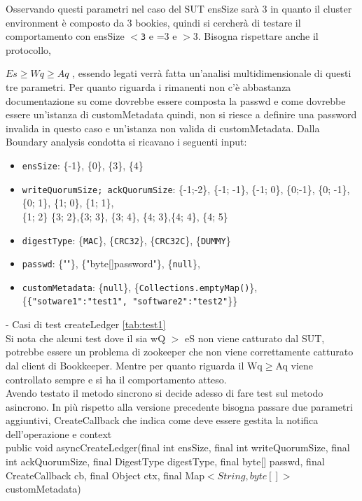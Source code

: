 \documentclass[10pt]{article}
\begin{document}
	Osservando questi parametri nel caso del SUT ensSize sarà 3 in quanto il cluster environment è composto da 3 bookies, quindi si cercherà di testare il comportamento con ensSize \texttt{$<$3} e =3 e \texttt{{$>3$}}. Bisogna rispettare anche il protocollo, {\texttt{$Es \ge Wq \ge Aq$} , essendo legati verrà fatta un'analisi multidimensionale di questi tre parametri. Per quanto riguarda i rimanenti non c'è abbastanza documentazione su come dovrebbe essere composta la passwd e come dovrebbe essere un'istanza di customMetadata quindi, non si riesce a definire una password invalida in questo caso e un'istanza non valida di customMetadata. Dalla Boundary analysis condotta si ricavano i seguenti input:
		\begin{itemize}[label=--, itemsep=2pt, parsep=0pt]
			\item \texttt{ensSize}: \{-1\}, \{0\}, \{3\}, \{4\}
			\item \texttt{writeQuorumSize; ackQuorumSize}: 
			\{-1;-2\}, \{-1; -1\}, \{-1; 0\},
			\{0;-1\}, \{0; -1\}, \{0; 1\},
			\{1; 0\}, \{1; 1\},\\ \{1; 2\}
			\{3; 2\},\{3; 3\}, \{3; 4\},
			\{4; 3\},\{4; 4\}, \{4; 5\}
			\item \texttt{digestType}: \{\texttt{MAC}\}, \{\texttt{CRC32}\}, \{\texttt{CRC32C}\}, \{\texttt{DUMMY}\}
			\item \texttt{passwd}: \{""\}, \{"byte[]password"\}, \{\texttt{null}\},
			\item \texttt{customMetadata}:  \{\texttt{null}\}, \{\texttt{Collections.emptyMap()}\}, \{\texttt{\{"sotware1":"test1", "software2":"test2"}\}\}
		\end{itemize}
		- Casi di test createLedger \autoref{tab:test1}\\
		Si nota che alcuni test dove il sia wQ \texttt{$>$} eS non viene catturato dal SUT, potrebbe essere un problema di zookeeper che non viene correttamente catturato dal client di Bookkeeper. Mentre per quanto riguarda il Wq\texttt{$\ge$}Aq viene controllato sempre e si ha il comportamento atteso.\\
		Avendo testato il metodo sincrono si decide adesso di fare test sul metodo asincrono.
		In più rispetto alla versione precedente bisogna passare due parametri aggiuntivi, CreateCallback che 
		indica come deve essere gestita la notifica dell'operazione e context\\
		\newpage
		public void asyncCreateLedger(final int ensSize, final int writeQuorumSize, final int ackQuorumSize, final DigestType digestType, final byte[] passwd, final CreateCallback cb, final Object ctx, final Map\texttt{$<String, byte[]>$} customMetadata)\\
}
\end{document}
